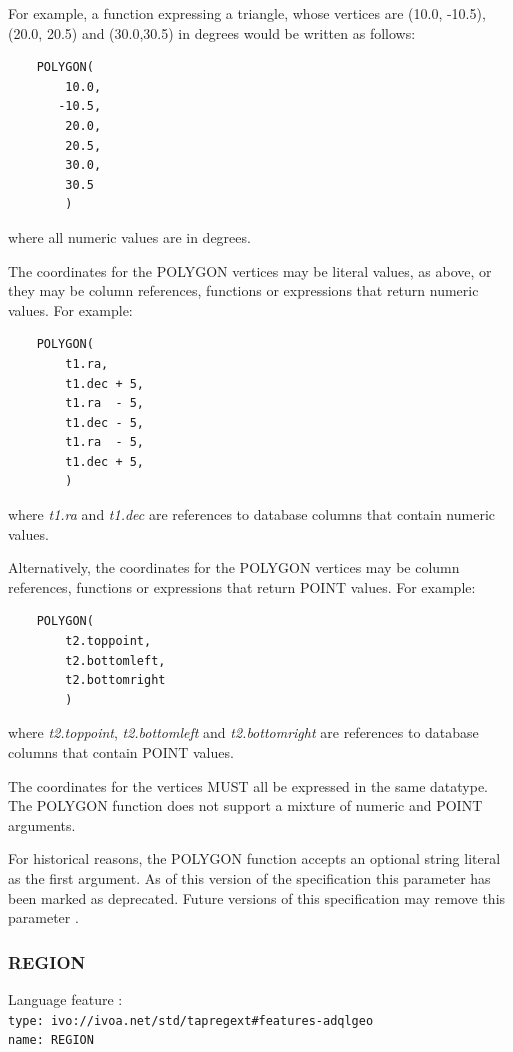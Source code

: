 \documentclass[11pt,a4paper]{ivoa}
\begin{document}
For example, a function expressing a triangle, whose vertices are (10.0,
-10.5), (20.0, 20.5) and (30.0,30.5) in degrees would be written
as follows:
\begin{verbatim}
    POLYGON(
        10.0,
       -10.5,
        20.0,
        20.5,
        30.0,
        30.5
        )
\end{verbatim}
\noindent
where all numeric values are in degrees.

The coordinates for the POLYGON vertices may be literal values, as above,
or they may be column references, functions or expressions that return
numeric values.
For example:
\begin{verbatim}
    POLYGON(
        t1.ra,
        t1.dec + 5,
        t1.ra  - 5,
        t1.dec - 5,
        t1.ra  - 5,
        t1.dec + 5,
        )
\end{verbatim}
\noindent
where \textit{t1.ra} and \textit{t1.dec} are references to database columns
that contain numeric values.

Alternatively, the coordinates for the POLYGON vertices may be column references,
functions or expressions that return POINT values.
For example:
\begin{verbatim}
    POLYGON(
        t2.toppoint,
        t2.bottomleft,
        t2.bottomright
        )
\end{verbatim}
\noindent
where \textit{t2.toppoint}, \textit{t2.bottomleft} and \textit{t2.bottomright}
are references to database columns that contain POINT values.

The coordinates for the vertices MUST all be expressed in the same datatype.
The POLYGON function does not support a mixture of numeric and POINT
arguments.

For historical reasons, the POLYGON function accepts an optional string literal
as the first argument.
As of this version of the specification this parameter has been
marked as deprecated.
Future versions of this specification may remove this parameter
.

\subsubsection{REGION}
\label{sec:functions.geom.region}

{\footnotesize Language feature :}\\
{\footnotesize \verb|type: ivo://ivoa.net/std/tapregext#features-adqlgeo|}\\
{\footnotesize \verb|name: REGION|}\\
\end{document}
